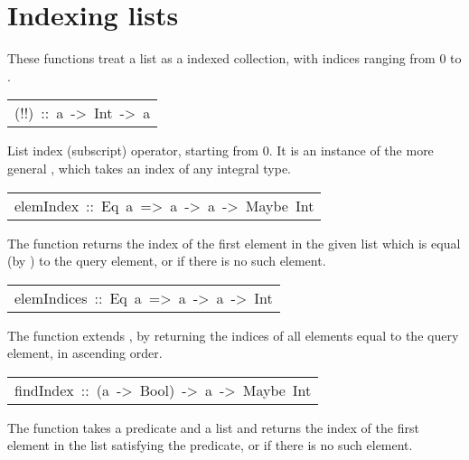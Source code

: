 \section{Indexing lists
}
These functions treat a list  as a indexed collection,
 with indices ranging from 0 to .
\par

\begin{haddockdesc}
\item[\begin{tabular}{@{}l}
(!!)\ ::\ {\char 91}a{\char 93}\ ->\ Int\ ->\ a
\end{tabular}]\haddockbegindoc
List index (subscript) operator, starting from 0.
 It is an instance of the more general ,
 which takes an index of any integral type.
\par

\end{haddockdesc}
\begin{haddockdesc}
\item[\begin{tabular}{@{}l}
elemIndex\ ::\ Eq\ a\ =>\ a\ ->\ {\char 91}a{\char 93}\ ->\ Maybe\ Int
\end{tabular}]\haddockbegindoc
The  function returns the index of the first element
 in the given list which is equal (by \haddockid{==}) to the query element,
 or  if there is no such element.
\par

\end{haddockdesc}
\begin{haddockdesc}
\item[\begin{tabular}{@{}l}
elemIndices\ ::\ Eq\ a\ =>\ a\ ->\ {\char 91}a{\char 93}\ ->\ {\char 91}Int{\char 93}
\end{tabular}]\haddockbegindoc
The  function extends , by returning the
 indices of all elements equal to the query element, in ascending order.
\par

\end{haddockdesc}
\begin{haddockdesc}
\item[\begin{tabular}{@{}l}
findIndex\ ::\ (a\ ->\ Bool)\ ->\ {\char 91}a{\char 93}\ ->\ Maybe\ Int
\end{tabular}]\haddockbegindoc
The  function takes a predicate and a list and returns
 the index of the first element in the list satisfying the predicate,
 or  if there is no such element.
\par

\end{haddockdesc}
